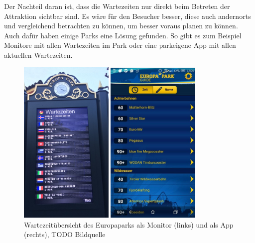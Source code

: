 Der Nachteil daran ist, dass die Wartezeiten  nur direkt beim Betreten der Attraktion sichtbar sind. Es wäre für den Besucher besser, diese auch andernorts und vergleichend betrachten zu können, um besser voraus planen zu können. Auch dafür haben einige Parks eine Lösung gefunden. So gibt es zum Beispiel Monitore mit allen Wartezeiten im Park oder eine parkeigene App mit allen aktuellen Wartezeiten. 

\begin{figure}[h]
    \centering
    \begin{minipage}{0.49\textwidth}
        \centering
        \includegraphics[width=0.4\textwidth]{img/motivation/wartezeit_anzeige.jpg}
    \end{minipage}
    \begin{minipage}{0.49\textwidth}
        \centering
        \includegraphics[width=0.4\textwidth]{img/motivation/app_official.jpg}
    \end{minipage}
\caption[Wartezeitübersicht im Europapark]{Wartezeitübersicht des Europaparks als Monitor (links) und als App (rechts), TODO Bildquelle}
		\label{figure:grundlagenwaittime2}
\end{figure}

